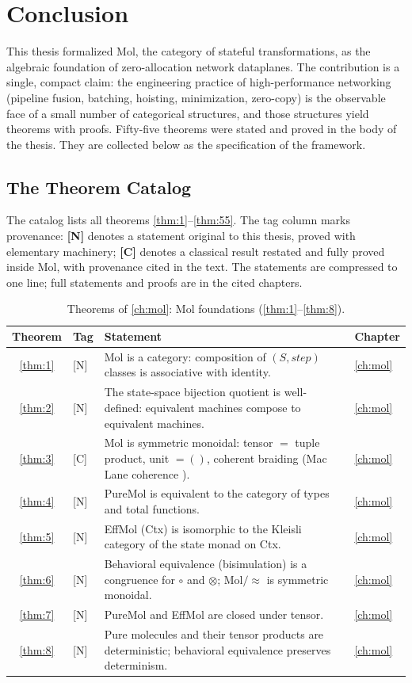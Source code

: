 \chapter{Conclusion}\label{ch:conclusion}

This thesis formalized Mol, the category of stateful transformations, as the algebraic foundation of zero-allocation network dataplanes. The contribution is a single, compact claim: the engineering practice of high-performance networking (pipeline fusion, batching, hoisting, minimization, zero-copy) is the observable face of a small number of categorical structures, and those structures yield theorems with proofs. Fifty-five theorems were stated and proved in the body of the thesis. They are collected below as the specification of the framework.

\section{The Theorem Catalog}
The catalog lists all theorems \autoref{thm:1}--\autoref{thm:55}. The tag column marks provenance: \textbf{[N]} denotes a statement original to this thesis, proved with elementary machinery; \textbf{[C]} denotes a classical result restated and fully proved inside Mol, with provenance cited in the text. The statements are compressed to one line; full statements and proofs are in the cited chapters.

\begin{table}[!htbp]
\centering
\caption{Theorems of \autoref{ch:mol}: Mol foundations (\autoref{thm:1}--\autoref{thm:8}).}
\label{tab:thm-mol}
\small
\begin{tabular}{@{}clp{7.2cm}l@{}}
\toprule
Theorem & Tag & Statement & Chapter\\
\midrule
\ref{thm:1} & [N] & Mol is a category: composition of $(S,\mathit{step})$ classes is associative with identity. & \autoref{ch:mol}\\
\ref{thm:2} & [N] & The state-space bijection quotient is well-defined: equivalent machines compose to equivalent machines. & \autoref{ch:mol}\\
\ref{thm:3} & [C] & Mol is symmetric monoidal: tensor $=$ tuple product, unit $=()$, coherent braiding (Mac Lane coherence \cite{maclane}). & \autoref{ch:mol}\\
\ref{thm:4} & [N] & PureMol is equivalent to the category of types and total functions. & \autoref{ch:mol}\\
\ref{thm:5} & [N] & EffMol (Ctx) is isomorphic to the Kleisli category of the state monad on Ctx. & \autoref{ch:mol}\\
\ref{thm:6} & [N] & Behavioral equivalence (bisimulation) is a congruence for $\circ$ and $\otimes$; Mol$/\!\!\approx$ is symmetric monoidal. & \autoref{ch:mol}\\
\ref{thm:7} & [N] & PureMol and EffMol are closed under tensor. & \autoref{ch:mol}\\
\ref{thm:8} & [N] & Pure molecules and their tensor products are deterministic; behavioral equivalence preserves determinism. & \autoref{ch:mol}\\
\bottomrule
\end{tabular}
\end{table}

